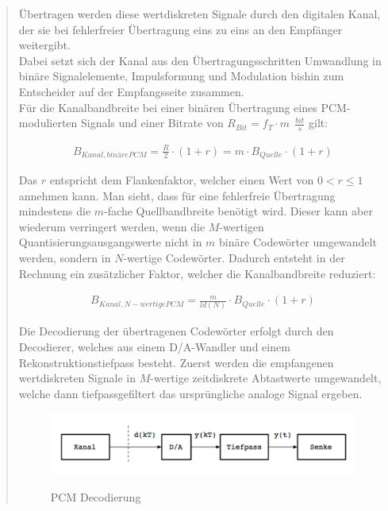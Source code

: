 \begin{quote}
	Übertragen werden diese wertdiskreten Signale durch den digitalen Kanal, der
	sie bei fehlerfreier Übertragung eins zu eins an den Empfänger weitergibt. \\
	
	Dabei setzt sich der Kanal aus den Übertragungsschritten Umwandlung in
	binäre Signalelemente, Impulsformung und Modulation bishin zum Entscheider 
	auf der Empfangsseite zusammen.\\
	Für die Kanalbandbreite bei einer binären Übertragung eines PCM-modulierten
	Signals und einer Bitrate von $R_{Bit} = f_T \cdot m \ \ \frac{bit}{s}$ gilt:
	 
       \begin{equation*}
        	\begin{split}
        		B_{Kanal,binäre PCM} = \frac{R}{2} \cdot (1+r)  =  m \cdot
        		B_{Quelle} \cdot (1+r)
        	\end{split}
        \end{equation*}        
        
	\vspace{0.5em}
	    
	Das $r$ entspricht dem Flankenfaktor, welcher einen Wert von $0 < r \leq 1$
	annehmen kann. Man sieht, dass für eine fehlerfreie Übertragung mindestens die
	 $m$-fache Quellbandbreite benötigt wird. Dieser kann aber wiederum verringert werden, wenn die $M$-wertigen
	Quantisierungsausgangswerte nicht in $m$ binäre Codewörter umgewandelt werden,
	sondern in $N$-wertige Codewörter. Dadurch entsteht in der Rechnung ein
	zusätzlicher Faktor, welcher die Kanalbandbreite reduziert:
	
	 \begin{equation*}
        	\begin{split}
        		B_{Kanal,N-wertige PCM} = \frac{m}{ld(N)} \cdot B_{Quelle} \cdot (1+r)
        	\end{split}
      \end{equation*}     
	
	\vspace{0.5em}
	
	Die Decodierung der übertragenen Codewörter erfolgt durch den Decodierer,
	welches aus einem D/A-Wandler und einem Rekonstruktionstiefpass besteht. Zuerst
	werden die empfangenen wertdiskreten Signale in $M$-wertige zeitdiskrete Abtastwerte
	umgewandelt, welche dann tiefpassgefiltert das ursprüngliche analoge Signal
	ergeben.\\
	
	\begin{figure}[H]
    \centering
        \includegraphics[scale=0.7, trim = 0cm 0cm 0cm 0cm, clip]{./Bilder/PCM_Decodierung}
            \caption{PCM Decodierung}
            \cite{PCM_Decodierung}
    \end{figure}
    

\end{quote}

